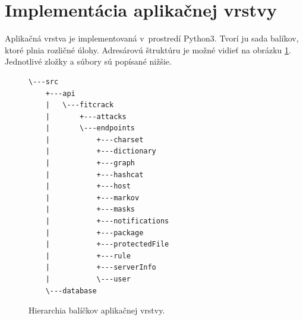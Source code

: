 \documentclass[slovak]{fitthesis}
\begin{document}
\section{Implementácia aplikačnej vrstvy}
Aplikačná vrstva je implementovaná v~prostredí Python3. Tvorí ju sada balíkov, ktoré plnia rozličné úlohy. Adresárovú štruktúru je možné vidieť na obrázku \ref{fig:serverStructure}. Jednotlivé zložky a súbory sú popísané nižšie.
\begin{figure}[H]
\begin{center}
\begin{varwidth}{\linewidth}
\begin{verbatim}
\---src
    +---api
    |   \---fitcrack
    |       +---attacks
    |       \---endpoints
    |           +---charset
    |           +---dictionary
    |           +---graph
    |           +---hashcat
    |           +---host
    |           +---markov
    |           +---masks
    |           +---notifications
    |           +---package
    |           +---protectedFile
    |           +---rule
    |           +---serverInfo
    |           \---user
    \---database
\end{verbatim}
\end{varwidth}
\end{center}
\caption{Hierarchia balíčkov aplikačnej vrstvy.}
\label{fig:serverStructure}
\end{figure}
\noindent
\end{document}
